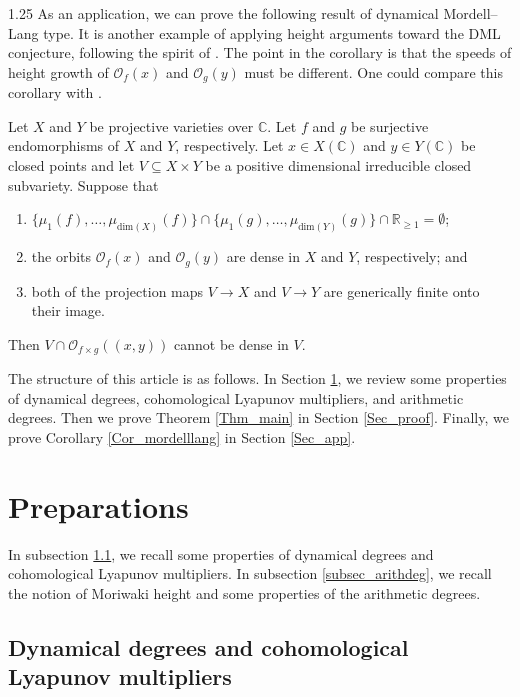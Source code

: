 \documentclass[12pt]{amsart}
\begin{document}
\begin{spacing}{1.25}
As an application, we can prove the following result of dynamical Mordell--Lang type. It is another example of applying height arguments toward the DML conjecture, following the spirit of \cite{XY}. The point in the corollary is that the speeds of height growth of $\mathcal{O}_f(x)$ and $\mathcal{O}_g(y)$ must be different. One could compare this corollary with \cite[Proposition 4.1]{XY}.

\begin{corollary}\label{Cor_mordelllang}
Let $X$ and $Y$ be projective varieties over $\mathbb{C}$. Let $f$ and $g$ be surjective endomorphisms of $X$ and $Y$, respectively. Let $x\in X(\mathbb{C})$ and $y\in Y(\mathbb{C})$ be closed points and let $V\subseteq X\times Y$ be a positive dimensional irreducible closed subvariety. Suppose that
\begin{enumerate}
\item
$\{\mu_1(f),\dots,\mu_{\mathrm{dim}(X)}(f)\}\cap\{\mu_1(g),\dots,\mu_{\mathrm{dim}(Y)}(g)\}\cap\mathbb{R}_{\geq1}=\emptyset$;
\item
the orbits $\mathcal{O}_f(x)$ and $\mathcal{O}_g(y)$ are dense in $X$ and $Y$, respectively; and
\item
both of the projection maps $V\rightarrow X$ and $V\rightarrow Y$ are generically finite onto their image.
\end{enumerate}
Then $V\cap\mathcal{O}_{f\times g}((x,y))$ cannot be dense in $V$.
\end{corollary}

The structure of this article is as follows. In Section \ref{Sec_pre}, we review some properties of dynamical degrees, cohomological Lyapunov multipliers, and arithmetic degrees. Then we prove Theorem \ref{Thm_main} in Section \ref{Sec_proof}. Finally, we prove Corollary \ref{Cor_mordelllang} in Section \ref{Sec_app}.










\section{Preparations}\label{Sec_pre}
In subsection \ref{subsec_dyndeg}, we recall some properties of dynamical degrees and cohomological Lyapunov multipliers. In subsection \ref{subsec_arithdeg}, we recall the notion of Moriwaki height and some properties of the arithmetic degrees.


\subsection{Dynamical degrees and cohomological Lyapunov multipliers}\label{subsec_dyndeg}


\end{spacing}
\end{document}

